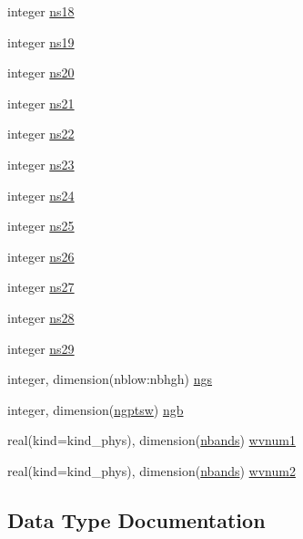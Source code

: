 \begin{DoxyCompactItemize}
integer \hyperlink{group__module__radsw__main_ga142f7aa9f12272d721cfeae2855eec49}{ns18}
\item 
integer \hyperlink{group__module__radsw__main_gab666e8da69b308ae5b09e187b8153518}{ns19}
\item 
integer \hyperlink{group__module__radsw__main_gad63ddbb0abcaeda56220a624a62a7336}{ns20}
\item 
integer \hyperlink{group__module__radsw__main_ga63b1d13965acda2c131123f67fe456ea}{ns21}
\item 
integer \hyperlink{group__module__radsw__main_ga194fffaa7b04c97d8133a9e5686e94d5}{ns22}
\item 
integer \hyperlink{group__module__radsw__main_ga547ab92fedb3e35198b384f0337a752c}{ns23}
\item 
integer \hyperlink{group__module__radsw__main_ga3cdaa790f548b6407ba586a824c5edc6}{ns24}
\item 
integer \hyperlink{group__module__radsw__main_gabaf12fd8281745e299a942530cef1a97}{ns25}
\item 
integer \hyperlink{group__module__radsw__main_ga3cf6dd031ffa5545db46bb1b54fe42b6}{ns26}
\item 
integer \hyperlink{group__module__radsw__main_ga801c6d2223877ddf3f633dc7ffcd528b}{ns27}
\item 
integer \hyperlink{group__module__radsw__main_gac2b720c6b0ab80759cfe83aa53fb4540}{ns28}
\item 
integer \hyperlink{group__module__radsw__main_gae966fc99ad683e9e0ee30f792db413fc}{ns29}
\item 
integer, dimension(nblow\+:nbhgh) \hyperlink{group__module__radsw__main_ga715ab3195493dff0639da443c21e4fb5}{ngs}
\item 
integer, dimension(\hyperlink{group__module__radsw__main_gadc3e4d5a848d50e2883e05c62f61bc97}{ngptsw}) \hyperlink{group__module__radsw__main_gafdd8496d7eaa017f7f1e08e998945c1e}{ngb}
\item 
real(kind=kind\+\_\+phys), dimension(\hyperlink{group__module__radsw__main_ga8f97b7698e8e5e2aec6e463fd09255cc}{nbands}) \hyperlink{group__module__radsw__main_gadc7827bd2bed6502a0a60b40b8f1deeb}{wvnum1}
\item 
real(kind=kind\+\_\+phys), dimension(\hyperlink{group__module__radsw__main_ga8f97b7698e8e5e2aec6e463fd09255cc}{nbands}) \hyperlink{group__module__radsw__main_ga88594ac7d3fbf13f2fdbac4b3b844d88}{wvnum2}
\end{DoxyCompactItemize}


\subsection{Data Type Documentation}
\label{structmodule__radsw__parameters_1_1topfsw__type}
\hypertarget{namespacemodule__radsw__parameters_structmodule__radsw__parameters_1_1topfsw__type}{}
